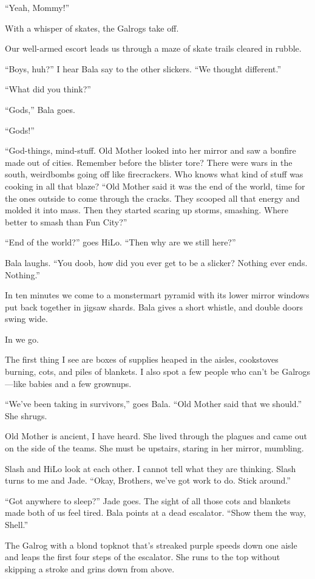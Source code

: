 “Yeah, Mommy!”

With a whisper of skates, the Galrogs take off.

Our well-armed escort leads us through a maze of skate trails cleared in rubble.

“Boys, huh?” I hear Bala say to the other slickers. “We thought different.”

“What did you think?”

“Gods,” Bala goes.

“Gods!”

“God-things, mind-stuff. Old Mother looked into her mirror and saw a bonfire made out of cities. Remember before the blister tore? There were wars in the south, weirdbombs going off like firecrackers. Who knows what kind of stuff was cooking in all that blaze? “Old Mother said it was the end of the world, time for the ones outside to come through the cracks. They scooped all that energy and molded it into mass. Then they started scaring up storms, smashing. Where better to smash than Fun City?”

“End of the world?” goes HiLo. “Then why are we still here?”

Bala laughs. “You doob, how did you ever get to be a slicker? Nothing ever ends. Nothing.”

In ten minutes we come to a monstermart pyramid with its lower mirror windows put back together in jigsaw shards. Bala gives a short whistle, and double doors swing wide.

In we go.

The first thing I see are boxes of supplies heaped in the aisles, cookstoves burning, cots, and piles of blankets. I also spot a few people who can't be Galrogs—like babies and a few grownups.

“We've been taking in survivors,” goes Bala. “Old Mother said that we should.” She shrugs.

Old Mother is ancient, I have heard. She lived through the plagues and came out on the side of the teams. She must be upstairs, staring in her mirror, mumbling.

Slash and HiLo look at each other. I cannot tell what they are thinking. Slash turns to me and Jade.
“Okay, Brothers, we've got work to do. Stick around.”

“Got anywhere to sleep?” Jade goes. The sight of all those cots and blankets made both of us feel tired.
Bala points at a dead escalator. “Show them the way, Shell.”

The Galrog with a blond topknot that's streaked purple speeds down one aisle and leaps the first four steps of the escalator. She runs to the top without skipping a stroke and grins down from above.

